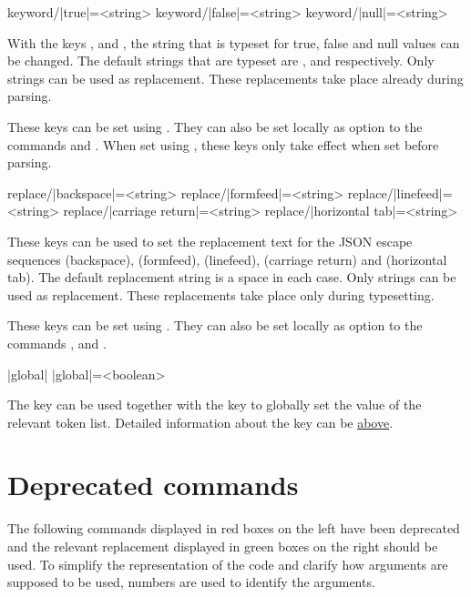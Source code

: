 \documentclass[a4paper]{article}
\begin{document}
{{\begin{macrodef}
keyword/|true|={<string>}
keyword/|false|={<string>}
keyword/|null|={<string>}
\end{macrodef}
With the keys ,  and , the string that is typeset for true, false and null values can be changed. The default strings that are typeset are ,  and  respectively. Only strings can be used as replacement. These replacements take place already during parsing.

These keys can be set using \macro{\JSONParseSet}. They can also be set locally as option to the commands \macro{\JSONParse} and \macro{\JSONParseFromFile}. When set using \macro{\JSONParseSet}, these keys only take effect when set before parsing.

\begin{macrodef}
replace/|backspace|={<string>}
replace/|formfeed|={<string>}
replace/|linefeed|={<string>}
replace/|carriage return|={<string>}
replace/|horizontal tab|={<string>}
\end{macrodef}
These keys can be used to set the replacement text for the JSON escape sequences \macro{\b} (backspace), \macro{\f} (formfeed), \macro{\n} (linefeed), \macro{\r} (carriage return) and \macro{\t} (horizontal tab). The default replacement string is a space in each case. Only strings can be used as replacement. These replacements take place only during typesetting.

These keys can be set using \macro{\JSONParseSet}. They can also be set locally as option to the commands \macro{\JSONParseValue}, \macro{\JSONParseArrayUse} and \macro{\JSONParseArrayMapFunction}.

\begin{macrodef}
|global|
|global|={<boolean>}
\end{macrodef}
The key  can be used together with the key  to globally set the value of the relevant token list. Detailed information about the key  can be \hyperlink{key:storein}{above}.

\section{Deprecated commands}

The following commands displayed in red boxes on the left have been deprecated and the relevant replacement displayed in green boxes on the right should be used. To simplify the representation of the code and clarify how arguments are supposed to be used, numbers are used to identify the arguments.

}}
\end{document}

